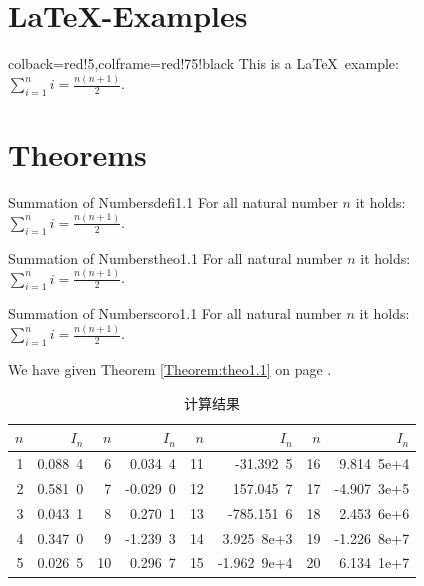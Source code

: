 \section{\LaTeX-Examples}

\begin{tcblisting}{colback=red!5,colframe=red!75!black}
This is a \LaTeX\ example:
$\displaystyle\sum\limits_{i=1}^n i = \frac{n(n+1)}{2}$.
\end{tcblisting}


\section{Theorems}

\begin{defi}{Summation of Numbers}{defi1.1}
  For all natural number $n$ it holds:\\[2mm]
  $\displaystyle\sum\limits_{i=1}^n i = \frac{n(n+1)}{2}$.
\end{defi}

\begin{theo}{Summation of Numbers}{theo1.1}
  For all natural number $n$ it holds:\\[2mm]
  $\displaystyle\sum\limits_{i=1}^n i = \frac{n(n+1)}{2}$.
\end{theo}

\begin{coro}{Summation of Numbers}{coro1.1}
  For all natural number $n$ it holds:\\[2mm]
  $\displaystyle\sum\limits_{i=1}^n i = \frac{n(n+1)}{2}$.
\end{coro}
We have given Theorem \ref{Theorem:theo1.1} on page \pageref{Theorem:theo1.1}.



\begin{table}[h]\begin{center}\color{darkblue}\caption{计算结果}\color{black}\label{tab1-1}
{\footnotesize
\begin{tabular}{r|r||r|r||r|r||r|r}\arrayrulecolor{darkblue}\hline\rowcolor{lightblue}
  $n$&$I_n$&$n$&$I_n$&$n$&$I_n$&$n$&$I_n$\\\hline
  1&0.088\ 4&6&0.034\ 4&11&-31.392\ 5&16&9.814\ 5e+4\\
  2&0.581\ 0&7&-0.029\ 0&12&157.045\ 7&17&-4.907\ 3e+5\\
  3&0.043\ 1&8&0.270\ 1&13&-785.151\ 6&18&2.453\ 6e+6\\
  4&0.347\ 0&9&-1.239\ 3&14&3.925\ 8e+3&19&-1.226\ 8e+7\\
  5&0.026\ 5&10&0.296\ 7&15&-1.962\ 9e+4&20&6.134\ 1e+7\\\hline
\end{tabular}}\end{center}\end{table}

